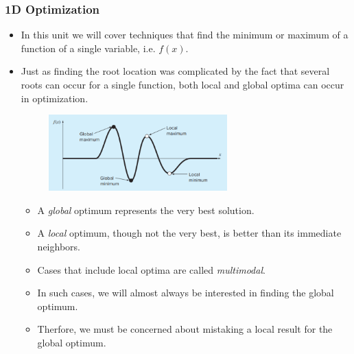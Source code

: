 \documentclass{if-beamer}
\begin{document}
\begin{frame}[t]
	\frametitle{1D Optimization}
	\begin{itemize}
		\item In this unit we will cover techniques that find the minimum or maximum of a function of a single variable, i.e. $f(x)$.
		\item Just as finding the root location was complicated by the fact that several roots can occur for a single function, both local
		and global optima can occur in optimization.
		\begin{figure}
			\centering
			\includegraphics[width = 0.65\textwidth]{figures/localglobal}
		\end{figure}
		\begin{itemize}
			\item A \textit{global} optimum represents the very best solution. 
			\item A \textit{local} optimum, though not the very best, is better than its immediate neighbors. 
			\item Cases that include local optima are called \textit{multimodal}. 
			\item In such cases, we will almost always be interested in finding the global optimum.
			\item Therfore, we must be concerned about mistaking a local result for the global optimum. 
		\end{itemize}
	\end{itemize}
\end{frame}
\end{document}
